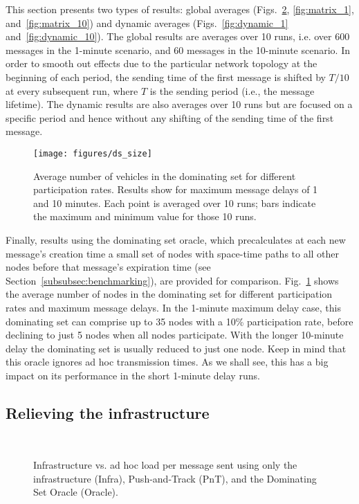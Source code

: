 \documentclass[preprint]{elsarticle}
\begin{document}
This section presents two types of results: global averages (Figs.~\ref{fig:infra_relief}, \ref{fig:matrix_1}, and~\ref{fig:matrix_10}) and dynamic averages (Figs.~\ref{fig:dynamic_1} and~\ref{fig:dynamic_10}). The global results are averages over 10 runs, i.e. over 600 messages in the 1-minute scenario, and 60 messages in the 10-minute scenario. In order to smooth out effects due to the particular network topology at the beginning of each period, the sending time of the first message is shifted by $T/10$ at every subsequent run, where $T$ is the sending period (i.e., the message lifetime). The dynamic results are also averages over 10 runs but are focused on a specific period and hence without any shifting of the sending time of the first message.

\begin{figure}[t]
  \centering
  \texttt{[image: figures/ds\_size]}
  \caption{Average number of vehicles in the dominating set for different participation rates. Results show for maximum message delays of 1 and 10 minutes. Each point is averaged over 10 runs; bars indicate the maximum and minimum value for those 10 runs.}
  \label{fig:ds_size}
\end{figure}

Finally, results using the dominating set oracle, which precalculates at each new message's creation time a small set of nodes with space-time paths to all other nodes before that message's expiration time (see Section~\ref{subsubsec:benchmarking}), are provided for comparison. Fig.~\ref{fig:ds_size} shows the average number of nodes in the dominating set for different participation rates and maximum message delays. In the 1-minute maximum delay case, this dominating set can comprise up to 35 nodes with a 10\% participation rate, before declining to just 5 nodes when all nodes participate. With the longer 10-minute delay the dominating set is usually reduced to just one node. Keep in mind that this oracle ignores ad hoc transmission times. As we shall see, this has a big impact on its performance in the short 1-minute delay runs.

\subsection{Relieving the infrastructure}
\label{subsec:relief}

\begin{figure}[t]
  \centering
   \\
  \caption{Infrastructure vs. ad hoc load per message sent using only the infrastructure (Infra), Push-and-Track (PnT), and the Dominating Set Oracle (Oracle).}
  \label{fig:infra_relief}
\end{figure}
\end{document}
